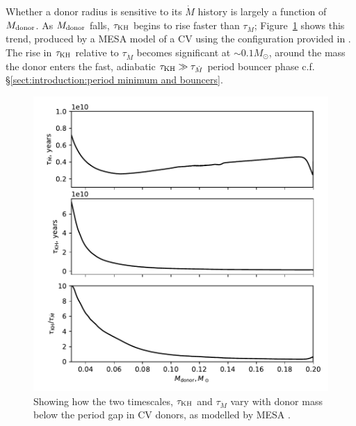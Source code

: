 Whether a donor radius is sensitive to its $\dot M$ history is largely a function of $M_{\rm donor}$. As $M_{\rm donor}$ falls, $\tau_{\rm KH}$ begins to rise faster than $\tau_{\dot M}$; Figure~\ref{fig:results:how does tauKH and tauMdot vary with donor mass} shows this trend, produced by a MESA model of a CV using the configuration provided in \citet{Paxton_2015}.
The rise in $\tau_{\rm KH}$ relative to $\tau_{\dot M}$ becomes significant at $\sim 0.1 M_\odot$, around the mass the donor enters the fast, adiabatic $\tau_{\rm KH} \gg \tau_{\dot M}$ period bouncer phase c.f. \S\ref{sect:introduction:period minimum and bouncers}.
\begin{figure}
    \centering
    \includegraphics[width=\textwidth]{figures/modelling/tau_both_vs_donor_mass_AML000.pdf}
    \caption{Showing how the two timescales, $\tau_{\rm KH}$ and $\tau_{\dot M}$ vary with donor mass below the period gap in CV donors, as modelled by MESA \citep{Paxton_2015,Pala2017a}.}
    \label{fig:results:how does tauKH and tauMdot vary with donor mass}
\end{figure}

